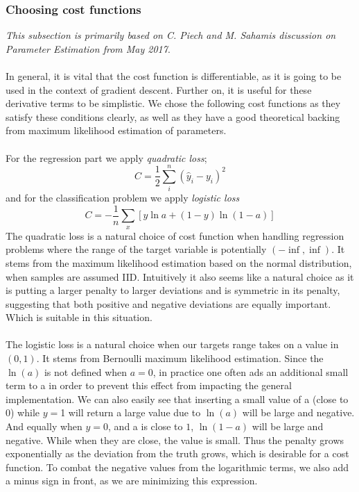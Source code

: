 \documentclass[10pt, a4paper, twocolumn]{article}
\begin{document}
		\subsubsection{Choosing cost functions}
			\textit{This subsection is primarily based on C. Piech and M. Sahamis discussion on Parameter Estimation from May 2017\cite{Stanford11}}.\\\\
			In general, it is vital that the cost function is differentiable, as it is going to be used in the context of gradient descent. Further on, it is useful for these derivative terms to be simplistic. We chose the following cost functions as they satisfy these conditions clearly, as well as they have a good theoretical backing from maximum likelihood estimation of parameters.\\\\
			For the regression part we apply \emph{quadratic loss}; 
				$$C = \frac{1}{2}\sum_i^n\left(\hat{y}_i-y_i\right)^2$$
			and for the classification problem we apply \emph{logistic loss}
				$$C = -\frac{1}{n} \sum_x \left[y \ln a + (1-y ) \ln (1-a) \right]$$
			The quadratic loss is a natural choice of cost function when handling regression problems where the range of the target variable is potentially $(-\inf, \inf)$. It stems from the maximum likelihood estimation based on the normal distribution, when samples are assumed IID. Intuitively it also seems like a natural choice as it is putting a larger penalty to larger deviations and is symmetric in its penalty, suggesting that both positive and negative deviations are equally important. Which is suitable in this situation.\\\\ 
			The logistic loss is a natural choice when our targets range takes on a value in $(0,1)$. It stems from Bernoulli maximum likelihood estimation. Since the $\ln(a)$ is not defined when $a = 0$, in practice one often ads an additional small term to a in order to prevent this effect from impacting the general implementation. We can also easily see that inserting a small value of a (close to $0$) while $y = $1 will return a large value due to $\ln(a)$ will be large and negative. And equally when $y = 0$, and a is close to $1$, $\ln(1-a)$ will be large and negative. While when they are close, the value is small. Thus the penalty grows exponentially as the deviation from the truth grows, which is desirable for a cost function. To combat the negative values from the logarithmic terms, we also add a minus sign in front, as we are minimizing this expression. 						
				
\end{document}
